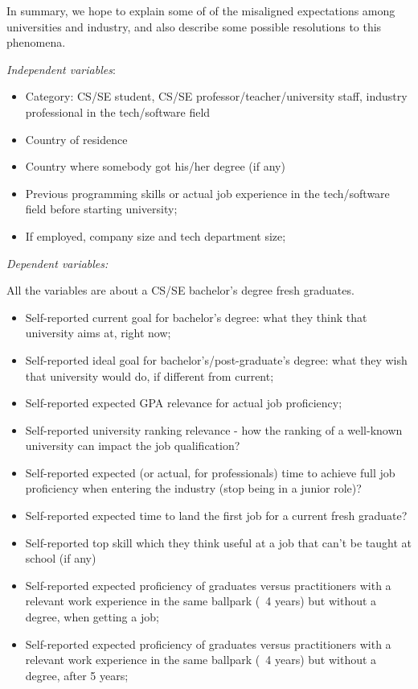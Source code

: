 \documentclass{sigchi}
\begin{document}
In summary, we hope to explain some of of the misaligned expectations among universities and industry, and also describe some possible resolutions to this phenomena. 

\textit{Independent variables}:
\begin{itemize}
	\item Category: CS/SE student, CS/SE professor/teacher/university staff, industry professional in the tech/software field
	\item Country of residence
	\item Country where somebody got his/her degree (if any)
	\item Previous programming skills or actual job experience in the tech/software field before starting university;
	\item If employed, company size and tech department size;
\end{itemize}

\textit{Dependent variables:}

All the variables are about a CS/SE bachelor's degree fresh graduates.

\begin{itemize}
	\item Self-reported current goal for bachelor's degree: what they think that university aims at, right now;
\item Self-reported ideal goal for bachelor's/post-graduate's degree: what they wish that university would do, if different from current;
\item Self-reported expected GPA relevance for actual job proficiency;
\item Self-reported university ranking relevance - how the ranking of a well-known university can impact the job qualification?
\item Self-reported expected (or actual, for professionals) time to achieve full job proficiency when entering the industry (stop being in a junior role)?
\item Self-reported expected time to land the first job for a current fresh graduate?
\item Self-reported top skill which they think useful at a job that can't be taught at school (if any)
\item Self-reported expected proficiency of graduates versus practitioners with a relevant work experience in the same ballpark (~4 years) but without a degree, when getting a job;
\item Self-reported expected proficiency of graduates versus practitioners with a relevant work experience in the same ballpark (~4 years) but without a degree, after 5 years;
\end{itemize}
\end{document}
